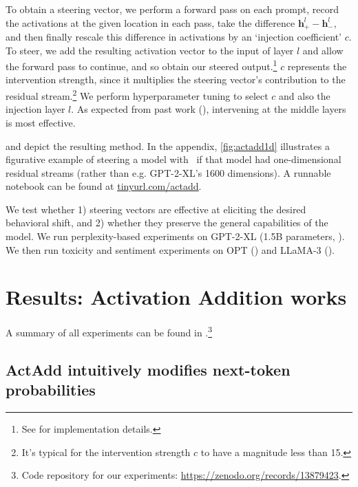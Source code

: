\documentclass{article}
\newcommand{\shortmethod}{\text{ActAdd}}
\theoremstyle{plain}
\theoremstyle{definition}
\theoremstyle{remark}
\begin{document}
To obtain a steering vector, we perform a forward pass on each prompt, record the activations at the given location in each pass, take the difference $\mathbf{h}_+^l - \mathbf{h}_-^l$, and then finally rescale this difference in activations by an `injection coefficient' $c$. To steer, we add the resulting activation vector to the input of layer $l$ and allow the forward pass to continue, and so obtain our steered output.\footnote{See   for implementation details.} $c$ represents  the intervention strength, since it multiplies the steering vector's contribution to the residual stream.\footnote{It's typical for the intervention strength $c$ to have a magnitude less than 15.} We perform hyperparameter tuning to select $c$ and also the injection layer $l$. As expected from past work (\cite{subramani-2022-extracting,mini2023understandingcontrollingmazesolvingpolicy}), intervening at the middle layers is most effective.


 and  depict the resulting {\shortmethod} method. In the appendix, \cref{fig:actadd1d} illustrates a figurative example of steering a model with {\shortmethod}~if that model had one-dimensional residual streams (rather than e.g. GPT-2-XL's 1600 dimensions).  
 A runnable notebook can be found at \underline{\href{https://tinyurl.com/actadd}{tinyurl.com/actadd}}.



We test whether 1) steering vectors are effective at eliciting the desired behavioral shift, and 2) whether they preserve the general capabilities of the model. We run perplexity-based experiments on GPT-2-XL (1.5B parameters, \cite{radford2019language}). We then run toxicity and sentiment experiments on OPT (\cite{zhang2022opt}) and LLaMA-3 (\cite{llama3}).

\section{Results: Activation Addition works}
\label{sec:result}


A summary of all experiments can be found in .\footnote{Code repository for our experiments: 
\url{https://zenodo.org/records/13879423}.}

\subsection{ActAdd intuitively modifies next-token probabilities}
\end{document}
